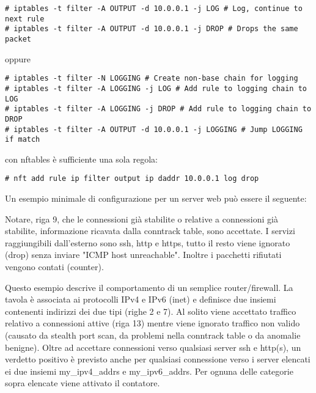 \begin{lstlisting}
# iptables -t filter -A OUTPUT -d 10.0.0.1 -j LOG # Log, continue to next rule
# iptables -t filter -A OUTPUT -d 10.0.0.1 -j DROP # Drops the same packet
\end{lstlisting}
oppure 
\begin{lstlisting}
# iptables -t filter -N LOGGING # Create non-base chain for logging
# iptables -t filter -A LOGGING -j LOG # Add rule to logging chain to LOG
# iptables -t filter -A LOGGING -j DROP # Add rule to logging chain to DROP
# iptables -t filter -A OUTPUT -d 10.0.0.1 -j LOGGING # Jump LOGGING if match
\end{lstlisting}
con nftables \`e sufficiente una sola regola:
\begin{lstlisting}
# nft add rule ip filter output ip daddr 10.0.0.1 log drop
\end{lstlisting}
Un esempio minimale di configurazione per un server web pu\`o essere
il seguente:

Notare, riga 9, che le connessioni già stabilite o relative a
connessioni già stabilite, informazione ricavata dalla conntrack table,
sono accettate.
I servizi raggiungibili dall'esterno sono ssh, http e https, tutto il resto
viene ignorato (drop) senza inviare "ICMP host unreachable". Inoltre i
pacchetti rifiutati vengono contati (counter).


Questo esempio descrive il comportamento di un semplice
router/firewall. La tavola è associata ai protocolli IPv4 e IPv6 (inet) e
definisce due insiemi contenenti indirizzi dei due tipi (righe 2 e 7).
Al solito viene accettato traffico relativo a connessioni attive (riga 13)
mentre viene ignorato traffico non valido (causato da stealth port scan, da
problemi nella conntrack table o da anomalie benigne).
Oltre ad accettare connessioni verso qualsiasi server ssh e http(s), un
verdetto positivo è previsto anche per qualsiasi connessione verso i server
elencati ei due insiemi my\_ipv4\_addrs e my\_ipv6\_addrs.
Per ognuna delle categorie sopra elencate viene attivato il contatore.

